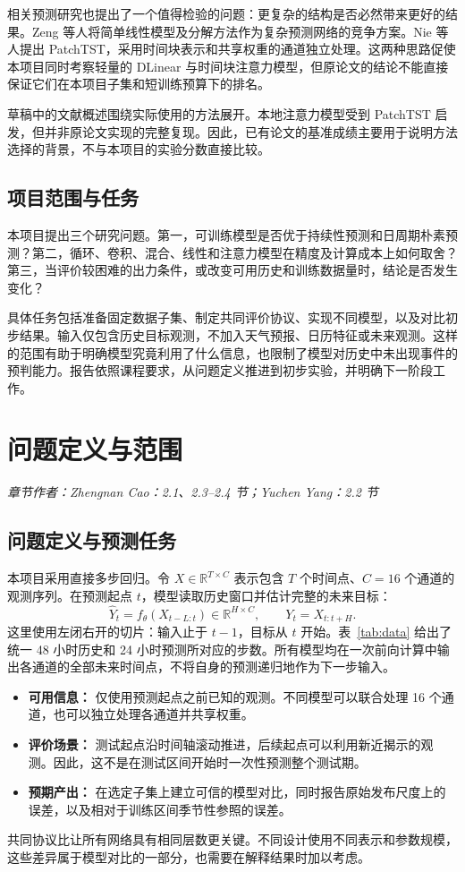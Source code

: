 \documentclass[12pt,a4paper,UTF8]{ctexart}
\newcommand{\sectionauthor}[1]{\noindent\textit{章节作者：#1}\par\vspace{3pt}}
\begin{document}
相关预测研究也提出了一个值得检验的问题：更复杂的结构是否必然带来更好的结果。Zeng 等人将简单线性模型及分解方法作为复杂预测网络的竞争方案\cite{dlinear}。Nie 等人提出 PatchTST，采用时间块表示和共享权重的通道独立处理\cite{patch}。这两种思路促使本项目同时考察轻量的 DLinear 与时间块注意力模型，但原论文的结论不能直接保证它们在本项目子集和短训练预算下的排名。

草稿中的文献概述围绕实际使用的方法展开。本地注意力模型受到 PatchTST 启发，但并非原论文实现的完整复现。因此，已有论文的基准成绩主要用于说明方法选择的背景，不与本项目的实验分数直接比较。

\subsection{项目范围与任务}
本项目提出三个研究问题。第一，可训练模型是否优于持续性预测和日周期朴素预测？第二，循环、卷积、混合、线性和注意力模型在精度及计算成本上如何取舍？第三，当评价较困难的出力条件，或改变可用历史和训练数据量时，结论是否发生变化？

具体任务包括准备固定数据子集、制定共同评价协议、实现不同模型，以及对比初步结果。输入仅包含历史目标观测，不加入天气预报、日历特征或未来观测。这样的范围有助于明确模型究竟利用了什么信息，也限制了模型对历史中未出现事件的预判能力。报告依照课程要求，从问题定义推进到初步实验，并明确下一阶段工作\cite{course}。

\FloatBarrier
\section{问题定义与范围}\label{sec:problem}
\sectionauthor{Zhengnan Cao：2.1、2.3--2.4 节；Yuchen Yang：2.2 节}
\subsection{问题定义与预测任务}
本项目采用直接多步回归。令 $X\in\mathbb{R}^{T\times C}$ 表示包含 $T$ 个时间点、$C=16$ 个通道的观测序列。在预测起点 $t$，模型读取历史窗口并估计完整的未来目标：
\begin{equation}\label{eq:task}
\widehat{Y}_{t}=f_{\theta}(X_{t-L:t})\in\mathbb{R}^{H\times C},
\qquad Y_t=X_{t:t+H}.
\end{equation}
这里使用左闭右开的切片：输入止于 $t-1$，目标从 $t$ 开始。表~\ref{tab:data} 给出了统一 48 小时历史和 24 小时预测所对应的步数。所有模型均在一次前向计算中输出各通道的全部未来时间点，不将自身的预测递归地作为下一步输入。

\begin{itemize}
\item \textbf{可用信息：} 仅使用预测起点之前已知的观测。不同模型可以联合处理 16 个通道，也可以独立处理各通道并共享权重。
\item \textbf{评价场景：} 测试起点沿时间轴滚动推进，后续起点可以利用新近揭示的观测。因此，这不是在测试区间开始时一次性预测整个测试期。
\item \textbf{预期产出：} 在选定子集上建立可信的模型对比，同时报告原始发布尺度上的误差，以及相对于训练区间季节性参照的误差。
\end{itemize}
共同协议比让所有网络具有相同层数更关键。不同设计使用不同表示和参数规模，这些差异属于模型对比的一部分，也需要在解释结果时加以考虑。
\end{document}
